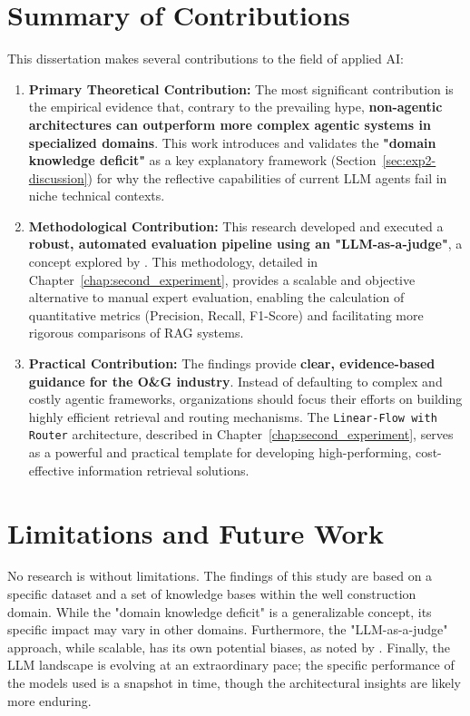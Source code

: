 \section{Summary of Contributions}
\label{sec:conclusion_contributions}

    This dissertation makes several contributions to the field of applied AI:

    \begin{enumerate}
        \item \textbf{Primary Theoretical Contribution:} The most significant contribution is the empirical evidence that, contrary to the prevailing hype, \textbf{non-agentic architectures can outperform more complex agentic systems in specialized domains}. This work introduces and validates the \textbf{"domain knowledge deficit"} as a key explanatory framework (Section~\ref{sec:exp2-discussion}) for why the reflective capabilities of current LLM agents fail in niche technical contexts.

        \item \textbf{Methodological Contribution:} This research developed and executed a \textbf{robust, automated evaluation pipeline using an "LLM-as-a-judge"}, a concept explored by \citet{Zheng2023}. This methodology, detailed in Chapter~\ref{chap:second_experiment}, provides a scalable and objective alternative to manual expert evaluation, enabling the calculation of quantitative metrics (Precision, Recall, F1-Score) and facilitating more rigorous comparisons of RAG systems.

        \item \textbf{Practical Contribution:} The findings provide \textbf{clear, evidence-based guidance for the O\&G industry}. Instead of defaulting to complex and costly agentic frameworks, organizations should focus their efforts on building highly efficient retrieval and routing mechanisms. The \texttt{Linear-Flow with Router} architecture, described in Chapter~\ref{chap:second_experiment}, serves as a powerful and practical template for developing high-performing, cost-effective information retrieval solutions.
    \end{enumerate}

\section{Limitations and Future Work}
\label{sec:conclusion_future_work}

    No research is without limitations. The findings of this study are based on a specific dataset and a set of knowledge bases within the well construction domain. While the "domain knowledge deficit" is a generalizable concept, its specific impact may vary in other domains. Furthermore, the "LLM-as-a-judge" approach, while scalable, has its own potential biases, as noted by \citet{Gu2025}. Finally, the LLM landscape is evolving at an extraordinary pace; the specific performance of the models used is a snapshot in time, though the architectural insights are likely more enduring.

